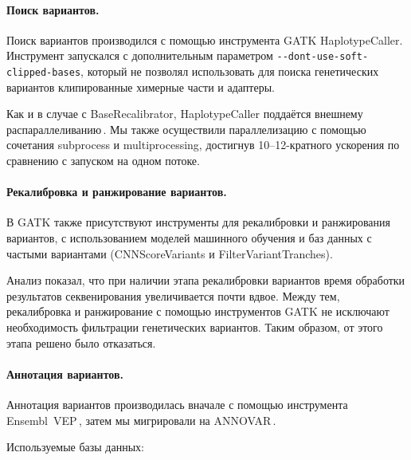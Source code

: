 \documentclass[a4paper,14pt]{extarticle}
\newcommand{\utilname}[1]{\textenglish{#1}}
\begin{document}
\paragraph{Поиск вариантов.}
Поиск вариантов производился с помощью инструмента \utilname{GATK HaplotypeCaller}.
Инструмент запускался с дополнительным параметром \verb|--dont-use-soft-clipped-bases|, который не позволял использовать для поиска генетических вариантов клипированные химерные части и адаптеры.

Как и в случае с \utilname{BaseRecalibrator}, \utilname{HaplotypeCaller} поддаётся внешнему распараллеливанию\,\citep{Heldenbrand_2019}.
Мы также осуществили параллелизацию с помощью сочетания \utilname{subprocess} и \utilname{multiprocessing}, достигнув 10--12-кратного ускорения по сравнению с запуском на одном потоке.

\paragraph{Рекалибровка и ранжирование вариантов.}
В GATK также присутствуют инструменты для рекалибровки и ранжирования вариантов, с использованием моделей машинного обучения и баз данных с частыми вариантами (\utilname{CNNScoreVariants} и \utilname{FilterVariantTranches}).

Анализ показал, что при наличии этапа рекалибровки вариантов время обработки результатов секвенирования увеличивается почти вдвое.
Между тем, рекалибровка и ранжирование с помощью инструментов GATK не исключают необходимость фильтрации генетических вариантов.
Таким образом, от этого этапа решено было отказаться.

\paragraph{Аннотация вариантов.}
Аннотация вариантов производилась вначале с помощью инструмента \utilname{Ensembl~VEP}\,\citep{McLaren_2016}, затем мы мигрировали на \utilname{ANNOVAR}\,\citep{Wang_2010}.

Используемые базы данных:
\end{document}
